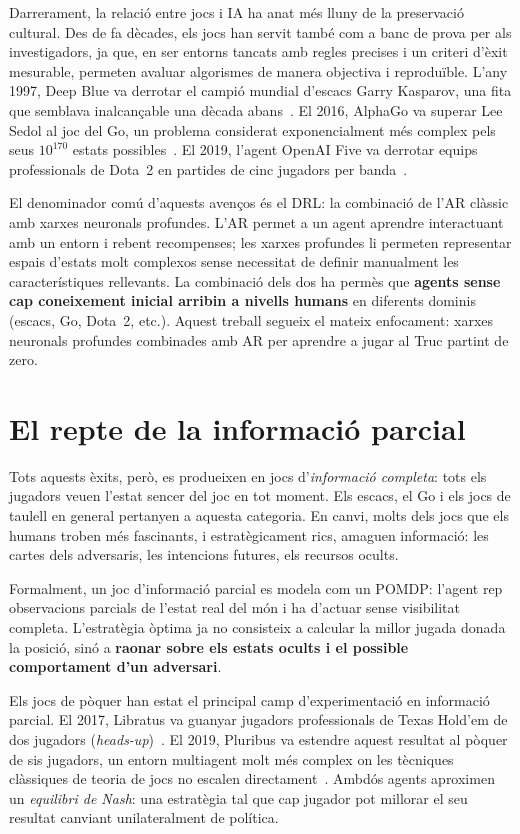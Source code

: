 Darrerament, la relació entre jocs i \ac{IA} ha anat més lluny de la preservació cultural.
Des de fa dècades, els jocs han servit també com a banc de prova per als investigadors,
ja que, en ser entorns tancats amb regles precises i un criteri d'èxit mesurable, permeten
avaluar algorismes de manera objectiva i reproduïble. L'any 1997, Deep Blue va derrotar
el campió mundial d'escacs Garry Kasparov, una fita que semblava inalcançable una dècada
abans~\cite{campbell2002deepblue}. El 2016, AlphaGo va superar Lee Sedol al joc del Go,
un problema considerat exponencialment més complex pels seus \(10^{170}\) estats
possibles~\cite{silver2016mastering}. El 2019, l'agent OpenAI Five va derrotar equips
professionals de Dota~2 en partides de cinc jugadors per banda~\cite{berner2019dota}.

El denominador comú d'aquests avenços és el \acf{DRL}: la combinació de l'\ac{AR}
clàssic amb xarxes neuronals profundes. L'\ac{AR} permet a un agent aprendre
interactuant amb un entorn i rebent recompenses; les xarxes profundes li permeten
representar espais d'estats molt complexos sense necessitat de definir manualment les
característiques rellevants. La combinació dels dos ha permès que \textbf{agents sense cap
coneixement inicial arribin a nivells humans} en diferents dominis (escacs, Go, Dota~2,
etc.). Aquest treball segueix el mateix enfocament: xarxes neuronals profundes
combinades amb \ac{AR} per aprendre a jugar al Truc partint de zero.

\section{El repte de la informació parcial}

Tots aquests èxits, però, es produeixen en jocs d'\emph{informació
completa}: tots els jugadors veuen l'estat sencer del joc en tot moment. Els escacs,
el Go i els jocs de taulell en general pertanyen a aquesta categoria. En canvi, molts
dels jocs que els humans troben més fascinants, i estratègicament rics, amaguen
informació: les cartes dels adversaris, les intencions futures, els recursos ocults.

Formalment, un joc d'informació parcial es modela com un \acf{POMDP}: l'agent
rep observacions parcials de l'estat real del món i ha d'actuar sense visibilitat
completa. L'estratègia òptima ja no consisteix a calcular la millor jugada donada la
posició, sinó a \textbf{raonar sobre els estats ocults i el possible comportament d'un adversari}.

Els jocs de pòquer han estat el principal camp d'experimentació en informació parcial.
El 2017, Libratus va guanyar jugadors professionals de Texas Hold'em de dos jugadors
(\emph{heads-up})~\cite{brown2018libratus}. El 2019, Pluribus va estendre aquest resultat
al pòquer de sis jugadors, un entorn multiagent molt més complex on les tècniques
clàssiques de teoria de jocs no escalen directament~\cite{brown2019pluribus}.
Ambdós agents aproximen un \emph{equilibri de Nash}: una estratègia tal que cap jugador
pot millorar el seu resultat canviant unilateralment de política.

